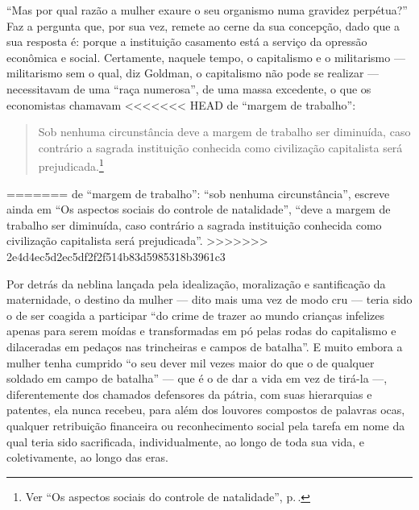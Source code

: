 ``Mas por qual razão a mulher exaure o seu organismo numa gravidez
perpétua?'' Faz a pergunta que, por sua vez, remete ao cerne da sua
concepção, dado que a sua resposta é: porque a instituição casamento
está a serviço da opressão econômica e social. Certamente, naquele
tempo, o capitalismo e o militarismo --- militarismo sem o qual, diz
Goldman, o capitalismo não pode se realizar --- necessitavam de uma
``raça numerosa'', de uma massa excedente, o que os economistas chamavam
<<<<<<< HEAD
de ``margem de trabalho'':

\begin{quote}
Sob nenhuma circunstância deve a margem de trabalho
ser diminuída, caso contrário a sagrada instituição conhecida como
civilização capitalista será prejudicada.\footnote{Ver ``Os aspectos sociais do controle de natalidade'', p.\,\pageref{margem}.}
\end{quote}
=======
de ``margem de trabalho'': ``sob nenhuma circunstância'', escreve ainda
em ``Os aspectos sociais do controle de natalidade'', ``deve a margem de
trabalho ser diminuída, caso contrário a sagrada instituição conhecida
como civilização capitalista será prejudicada''. 
>>>>>>> 2e4d4ec5d2ec5df2f2f514b83d5985318b3961c3

Por detrás da neblina
lançada pela idealização, moralização e santificação da maternidade, o
destino da mulher --- dito mais uma vez de modo cru --- teria sido o de
ser coagida a participar ``do crime de trazer ao mundo crianças
infelizes apenas para serem moídas e transformadas em pó pelas rodas do
capitalismo e dilaceradas em pedaços nas trincheiras e campos de
batalha''. E muito embora a mulher tenha cumprido ``o seu dever mil vezes maior do
que o de qualquer soldado em campo de batalha'' --- que é o de dar
a vida em vez de tirá-la ---, diferentemente dos chamados defensores da
pátria, com suas hierarquias e patentes, ela nunca recebeu, para além
dos louvores compostos de palavras ocas, qualquer retribuição financeira
ou reconhecimento social pela tarefa em nome da qual teria sido
sacrificada, individualmente, ao longo de toda sua vida, e
coletivamente, ao longo das eras.

